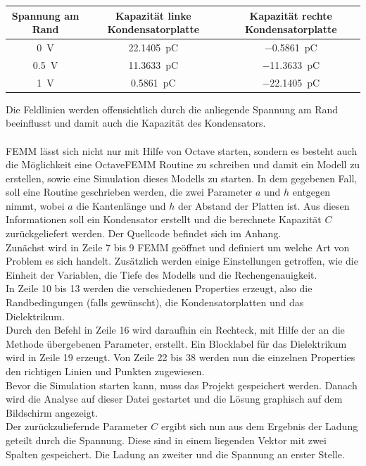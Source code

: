 \begin{table}[h]
	\centering
	\begin{tabular}[h]{c|c c}
		Spannung am Rand & Kapazität linke Kondensatorplatte & Kapazität rechte Kondensatorplatte \\
		\hline
		\SI{0}{\volt} &  \SI{22,1405}{\pico\coulomb} & \SI{-0,5861}{\pico\coulomb} \\
		\SI{0,5}{\volt} & \SI{11,3633}{\pico\coulomb} & \SI{-11,3633}{\pico\coulomb} \\
		\SI{1}{\volt} &  \SI{0,5861}{\pico\coulomb} & \SI{-22,1405}{\pico\coulomb}
	\end{tabular}
\end{table}
\vspace*{1.5cm}
Die Feldlinien werden offensichtlich durch die anliegende Spannung am Rand beeinflusst und damit auch die Kapazität des Kondensators.
\\
\\
FEMM lässt sich nicht nur mit Hilfe von Octave starten, sondern es besteht auch die Möglichkeit eine OctaveFEMM Routine zu schreiben und damit ein Modell zu erstellen, sowie eine Simulation dieses Modells zu starten. In dem gegebenen Fall, soll eine Routine geschrieben werden, die zwei Parameter $a$ und $h$ entgegen nimmt, wobei $a$ die Kantenlänge und $h$ der Abstand der Platten ist. Aus diesen Informationen soll ein Kondensator erstellt und die berechnete Kapazität $C$ zurückgeliefert werden. Der Quellcode befindet sich im Anhang. \\ 
\newpage
Zunächst wird in Zeile 7 bis 9 FEMM geöffnet und definiert um welche Art von Problem es sich handelt. Zusätzlich werden einige Einstellungen getroffen, wie die Einheit der Variablen, die Tiefe des Modells und die Rechengenauigkeit. \\ 
In Zeile 10 bis 13 werden die verschiedenen Properties erzeugt, also die Randbedingungen (falls gewünscht), die Kondensatorplatten und das Dielektrikum. \\
Durch den Befehl in Zeile 16 wird daraufhin ein Rechteck, mit Hilfe der an die Methode übergebenen Parameter,  erstellt. Ein Blocklabel für das Dielektrikum wird in Zeile 19 erzeugt. Von Zeile 22 bis 38 werden nun die einzelnen Properties den richtigen Linien und Punkten zugewiesen.\\
Bevor die Simulation starten kann, muss das Projekt gespeichert werden. Danach wird die Analyse auf dieser Datei gestartet und die Lösung graphisch auf dem Bildschirm angezeigt.\\
Der zurückzuliefernde Parameter $C$ ergibt sich nun aus dem Ergebnis der Ladung geteilt durch die Spannung. Diese sind in einem liegenden Vektor mit zwei Spalten gespeichert. Die Ladung an zweiter und die Spannung an erster Stelle. 